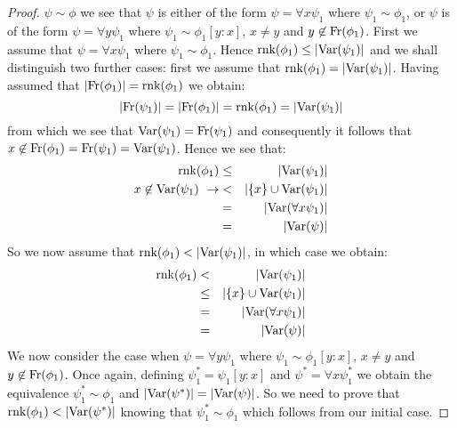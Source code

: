 \begin{proof}
$\psi\sim\phi$ we see that $\psi$ is either of the form
$\psi=\forall x\psi_{1}$ where $\psi_{1}\sim\phi_{1}$, or $\psi$ is
of the form $\psi=\forall y\psi_{1}$ where
$\psi_{1}\sim\phi_{1}[y\!:\!x]$, $x\neq y$ and
$y\not\in\mbox{\rm Fr}(\phi_{1})$. First we assume that $\psi=\forall
x\psi_{1}$ where $\psi_{1}\sim\phi_{1}$. Hence
$\mbox{\rm rnk}(\phi_{1})\leq|\mbox{\rm Var}(\psi_{1})|$ and we shall distinguish two
further cases: first we assume that
$\mbox{\rm rnk}(\phi_{1})=|\mbox{\rm Var}(\psi_{1})|$. Having assumed that
$|\mbox{\rm Fr}(\phi_{1})|=\mbox{\rm rnk}(\phi_{1})$ we obtain:
    \[
    |\mbox{\rm Fr}(\psi_{1})|=|\mbox{\rm Fr}(\phi_{1})|=\mbox{\rm rnk}(\phi_{1})=|\mbox{\rm Var}(\psi_{1})|
    \]
from which we see that $\mbox{\rm Var}(\psi_{1})=\mbox{\rm Fr}(\psi_{1})$ and
consequently it follows that
$x\not\in\mbox{\rm Fr}(\phi_{1})=\mbox{\rm Fr}(\psi_{1})=\mbox{\rm Var}(\psi_{1})$. Hence we
see that:
    \begin{eqnarray*}
    \mbox{\rm rnk}(\phi_{1})&\leq&|\mbox{\rm Var}(\psi_{1})|\\
    x\not\in\mbox{\rm Var}(\psi_{1})\ \rightarrow
    &<&|\{x\}\cup\mbox{\rm Var}(\psi_{1})|\\
    &=&|\mbox{\rm Var}(\forall x\psi_{1})|\\
    &=&|\mbox{\rm Var}(\psi)|
    \end{eqnarray*}
So we now assume that $\rnk(\phi_{1})<|\var(\psi_{1})|$, in which
case we obtain:
    \begin{eqnarray*}
    \mbox{\rm rnk}(\phi_{1})&<&|\mbox{\rm Var}(\psi_{1})|\\
    &\leq&|\{x\}\cup\mbox{\rm Var}(\psi_{1})|\\
    &=&|\mbox{\rm Var}(\forall x\psi_{1})|\\
    &=&|\mbox{\rm Var}(\psi)|
    \end{eqnarray*}
We now consider the case when $\psi=\forall y\psi_{1}$ where
$\psi_{1}\sim\phi_{1}[y\!:\!x]$, $x\neq y$ and
$y\not\in\mbox{\rm Fr}(\phi_{1})$. Once again, defining
$\psi_{1}^{*}=\psi_{1}[y\!:\!x]$ and $\psi^{*}=\forall
x\psi_{1}^{*}$ we obtain the equivalence $\psi_{1}^{*}\sim\phi_{1}$
and $|\mbox{\rm Var}(\psi^{*})|=|\mbox{\rm Var}(\psi)|$. So we need to prove that
$\rnk(\phi_{1})<|\var(\psi^{*})|$ knowing that
$\psi_{1}^{*}\sim\phi_{1}$ which follows from our initial case.
\end{proof}

